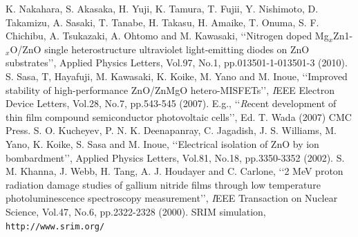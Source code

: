 \documentclass{ujarticle}
\begin{document}
{\begin{multicols}{2}
\begin{thebibliography}{99}
%
 K. Nakahara, S. Akasaka, H. Yuji, K. Tamura, T. Fujii, Y. Nishimoto, D. Takamizu, A. Sasaki, T. Tanabe, H. Takasu, H. Amaike, T. Onuma, S. F. Chichibu, A. Tsukazaki, A. Ohtomo and M. Kawasaki, \lq\lq Nitrogen doped Mg$_{x}$Zn1-$_{x}$O/ZnO single heterostructure ultraviolet light-emitting diodes on ZnO substrates\rq\rq , Applied Physics Letters, Vol.97, No.1, pp.013501-1-013501-3 (2010).
%
 S. Sasa, T, Hayafuji, M. Kawasaki, K. Koike, M. Yano and M. Inoue, \lq\lq Improved stability of high-performance ZnO/ZnMgO hetero-MISFETs\rq\rq , {\textit IEEE Electron Device Letters}, Vol.28, No.7, pp.543-545 (2007).
%
 E.g., \lq\lq {\textit Recent development of thin film compound semiconductor photovoltaic cells}\rq\rq , Ed. T. Wada (2007) CMC Press.
%
 S. O. Kucheyev, P. N. K. Deenapanray, C. Jagadish, J. S. Williams, M. Yano, K. Koike, S. Sasa and M. Inoue, \lq\lq Electrical isolation of ZnO by ion bombardment\rq\rq , Applied Physics Letters, Vol.81, No.18, pp.3350-3352 (2002).
%
 S. M. Khanna, J. Webb, H. Tang, A. J. Houdayer and C. Carlone, \lq\lq 2 MeV proton radiation damage studies of gallium nitride films through low temperature photoluminescence spectroscopy measurement\rq\rq , {\textit IEEE Transaction on Nuclear Science}, Vol.47, No.6, pp.2322-2328 (2000).
%
 SRIM simulation, {\tt http://www.srim.org/}
%
\end{thebibliography}

%

\end{multicols}
}%
\end{document}
